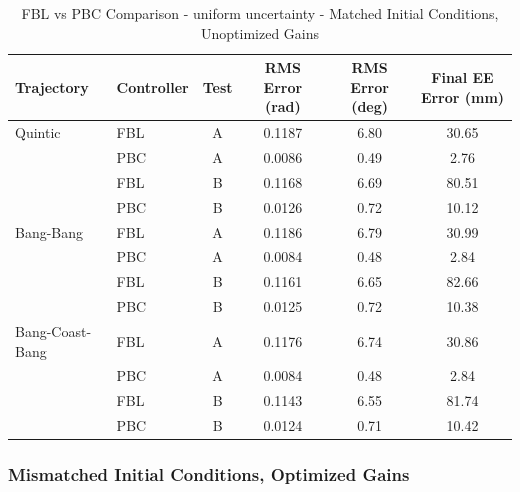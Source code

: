 \documentclass[11pt,a4paper]{article}
\begin{document}
\begin{table}[H]
\centering
\caption{FBL vs PBC Comparison - uniform uncertainty - Matched Initial Conditions, Unoptimized Gains}
\begin{tabular}{llcccc}
\toprule
Trajectory & Controller & Test & RMS Error (rad) & RMS Error (deg) & Final EE Error (mm) \\
\midrule
Quintic & FBL & A & 0.1187 & 6.80 & 30.65 \\
 & PBC & A & \textcolor{bestcolor}{0.0086} & \textcolor{bestcolor}{0.49} & \textcolor{bestcolor}{2.76} \\
 & FBL & B & 0.1168 & 6.69 & 80.51 \\
 & PBC & B & \textcolor{bestcolor}{0.0126} & \textcolor{bestcolor}{0.72} & \textcolor{bestcolor}{10.12} \\
\midrule
Bang-Bang & FBL & A & 0.1186 & 6.79 & 30.99 \\
 & PBC & A & \textcolor{bestcolor}{0.0084} & \textcolor{bestcolor}{0.48} & \textcolor{bestcolor}{2.84} \\
 & FBL & B & 0.1161 & 6.65 & 82.66 \\
 & PBC & B & \textcolor{bestcolor}{0.0125} & \textcolor{bestcolor}{0.72} & \textcolor{bestcolor}{10.38} \\
\midrule
Bang-Coast-Bang & FBL & A & 0.1176 & 6.74 & 30.86 \\
 & PBC & A & \textcolor{bestcolor}{0.0084} & \textcolor{bestcolor}{0.48} & \textcolor{bestcolor}{2.84} \\
 & FBL & B & 0.1143 & 6.55 & 81.74 \\
 & PBC & B & \textcolor{bestcolor}{0.0124} & \textcolor{bestcolor}{0.71} & \textcolor{bestcolor}{10.42} \\
\bottomrule
\end{tabular}
\end{table}

\subsubsection{Mismatched Initial Conditions, Optimized Gains}
\end{document}
